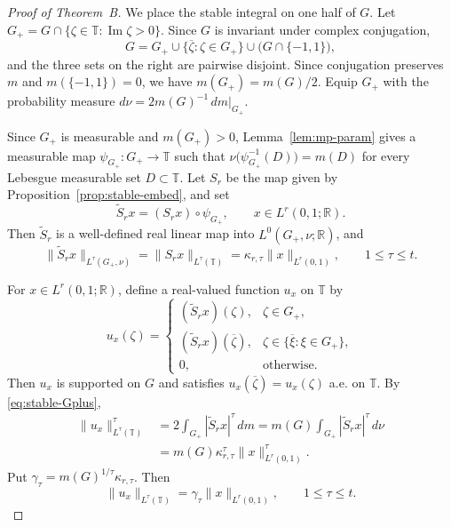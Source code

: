 \documentclass[10pt,a4paper]{amsart}
\newcommand{\T}{\mathbb{T}}
\newcommand{\R}{\mathbb{R}}
\begin{document}
\begin{proof}[Proof of Theorem~B]
We place the stable integral on one half of \(G\).  Let
\(G_+=G\cap\{\zeta\in\T:\operatorname{Im}\zeta>0\}\). Since \(G\) is invariant under complex conjugation,
\[
        G
        =
        G_+
        \cup
        \{\overline\zeta:\zeta\in G_+\}
        \cup
        \bigl(G\cap\{-1,1\}\bigr),
\]
and the three sets on the right are pairwise disjoint. Since conjugation preserves \(m\) and \(m(\{-1,1\})=0\),
we have \(m(G_+)=m(G)/2\). Equip \(G_+\) with the probability measure
\(d\nu=2m(G)^{-1}\,dm|_{G_+}\).

Since \(G_+\) is measurable and \(m(G_+)>0\),
Lemma~\ref{lem:mp-param} gives a measurable map \(\psi_{G_+}\colon G_+\to\T\) such that
\(\nu\bigl(\psi_{G_+}^{-1}(D)\bigr)=m(D)
\)
for every Lebesgue measurable set \(D\subset\T\).
Let \(S_r\) be the map given by
Proposition~\ref{prop:stable-embed}, and set
\[
        \widetilde S_r x
        =
        (S_r x)\circ\psi_{G_+},
        \qquad
        x\in L^r(0,1;\R).
\]
Then \(\widetilde S_r\) is a well-defined real linear map into
\(L^0(G_+,\nu;\R)\), and
\begin{equation}
\label{eq:stable-Gplus}
        \|\widetilde S_r x\|_{L^\tau(G_+,\nu)}
        =
        \|S_r x\|_{L^\tau(\T)}
        =
        \kappa_{r,\tau}\|x\|_{L^r(0,1)},
        \qquad
        1\le\tau\le t.
\end{equation}

For \(x\in L^r(0,1;\R)\), define a real-valued function \(u_x\) on
\(\T\) by
\[
        u_x(\zeta)
        =
        \begin{cases}
        (\widetilde S_rx)(\zeta),
                & \zeta\in G_+,\\[1mm]
        (\widetilde S_rx)(\overline\zeta),
                & \zeta\in
                  \{\overline\xi:\xi\in G_+\},\\[1mm]
        0,
                & \text{otherwise}.
        \end{cases}
\]
Then \(u_x\) is supported on \(G\) and satisfies
\(u_x(\overline\zeta)=u_x(\zeta)\) a.e. on \(\T\).  By
\eqref{eq:stable-Gplus},
\[
\begin{aligned}
        \|u_x\|_{L^\tau(\T)}^\tau
        &=
        2\int_{G_+}|\widetilde S_rx|^\tau\,dm =
        m(G)\int_{G_+}|\widetilde S_rx|^\tau\,d\nu\\
        &=
        m(G)\kappa_{r,\tau}^\tau
        \|x\|_{L^r(0,1)}^\tau.
\end{aligned}
\]
Put \(\gamma_\tau=m(G)^{1/\tau}\kappa_{r,\tau}\).  Then
\begin{equation}
\label{eq:sym-moments}
        \|u_x\|_{L^\tau(\T)}
        =
        \gamma_\tau\|x\|_{L^r(0,1)},
        \qquad
        1\le\tau\le t.
\end{equation}


\end{proof}
\end{document}
